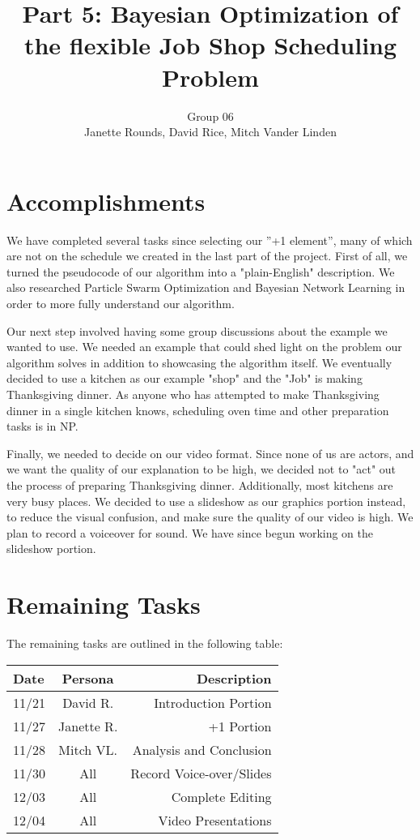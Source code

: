\documentclass[11pt,twocolumn]{article}
\title{Part 5: Bayesian Optimization of the flexible Job Shop Scheduling Problem}
\author{Group 06 \\ 
\small Janette Rounds, \small David Rice, \small Mitch Vander Linden}
\begin{document}
	\maketitle
	\section{Accomplishments} 
	We have completed several tasks since selecting our ''+1 element'', many of which are not on the schedule we created in the last part of the project. First of all, we turned the pseudocode of our algorithm into a "plain-English" description. We also researched Particle Swarm Optimization and Bayesian Network Learning in order to more fully understand our algorithm. 
	
	Our next step involved having some group discussions about the example we wanted to use. We needed an example that could shed light on the problem our algorithm solves in addition to showcasing the algorithm itself. We eventually decided to use a kitchen as our example "shop" and the "Job" is making Thanksgiving dinner. As anyone who has attempted to make Thanksgiving dinner in a single kitchen knows, scheduling oven time and other preparation tasks is in NP. 
	
	Finally, we needed to decide on our video format. Since none of us are actors, and we want the quality of our explanation to be high, we decided not to "act" out the process of preparing Thanksgiving dinner. Additionally, most kitchens are very busy places. We decided to use a slideshow as our graphics portion instead, to reduce the visual confusion, and make sure the quality of our video is high. We plan to record a voiceover for sound. We have since begun working on the slideshow portion. 
	
	\section{Remaining Tasks}
	The remaining tasks are outlined in the following table:
	
	\begin{table}[h!]
	\centering
	\begin{tabular}{ |l | c | r|}
	  \hline
	  Date & Persona & Description \\
	  \hline
	  \hline
	  11/21 & David R. & Introduction Portion \\
	  \hline
	  11/27 & Janette R. & +1 Portion \\
	  \hline
	  11/28 & Mitch VL. & Analysis and Conclusion \\
	  \hline
	  11/30 & All & Record Voice-over/Slides \\
	  \hline
	  12/03 & All & Complete Editing \\
	  \hline
	  12/04 & All & Video Presentations \\
	  \hline
	\end{tabular}
	\end{table}
	
\end{document}
